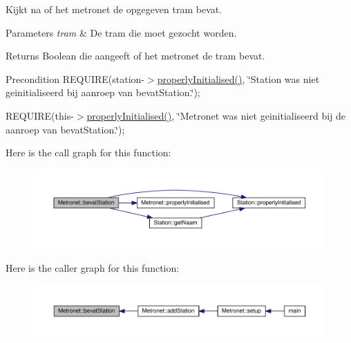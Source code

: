 Kijkt na of het metronet de opgegeven tram bevat. 


\begin{DoxyParams}{Parameters}
{\em tram} & De tram die moet gezocht worden. \\
\hline
\end{DoxyParams}
\begin{DoxyReturn}{Returns}
Boolean die aangeeft of het metronet de tram bevat. 
\end{DoxyReturn}
\begin{DoxyPrecond}{Precondition}
R\+E\+Q\+U\+I\+RE(station-\/$>$\hyperlink{class_metronet_a3d2adce29a947f162924279b766de645}{properly\+Initialised()}, \char`\"{}\+Station was niet geinitialiseerd bij aanroep van bevat\+Station.\char`\"{}); 

R\+E\+Q\+U\+I\+RE(this-\/$>$\hyperlink{class_metronet_a3d2adce29a947f162924279b766de645}{properly\+Initialised()}, \char`\"{}\+Metronet was niet geinitialiseerd bij de aanroep van bevat\+Station.\char`\"{}); 
\end{DoxyPrecond}


Here is the call graph for this function\+:
\nopagebreak
\begin{figure}[H]
\begin{center}
\leavevmode
\includegraphics[width=350pt]{class_metronet_a8f2d201eee99681d122fd9031cf4d6c6_cgraph}
\end{center}
\end{figure}




Here is the caller graph for this function\+:
\nopagebreak
\begin{figure}[H]
\begin{center}
\leavevmode
\includegraphics[width=350pt]{class_metronet_a8f2d201eee99681d122fd9031cf4d6c6_icgraph}
\end{center}
\end{figure}



